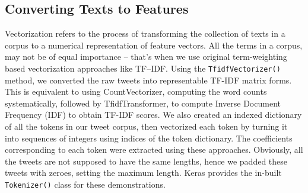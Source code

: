 \subsection{Converting Texts to Features}
Vectorization refers to the process of transforming the collection of texts in a corpus to a numerical representation of feature vectors. All the terms in a corpus, may not be of equal importance – that’s when we use original term-weighting based vectorization approaches like TF–IDF. Using the \verb|TfidfVectorizer()| method, we converted the raw tweets into representable TF-IDF matrix forms. This is equivalent to using CountVectorizer, computing the word counts systematically, followed by TfidfTransformer, to compute Inverse Document Frequency (IDF) to obtain TF-IDF scores. We also created an indexed dictionary of all the tokens in our tweet corpus, then vectorized each token by turning it into sequences of integers using indices of the token dictionary. The coefficients corresponding to each token were extracted using these approaches. Obviously, all the tweets are not supposed to have the same lengths, hence we padded these tweets with zeroes, setting the maximum length. Keras provides the in-built \verb|Tokenizer()| class for these demonstrations.


	
	
	
